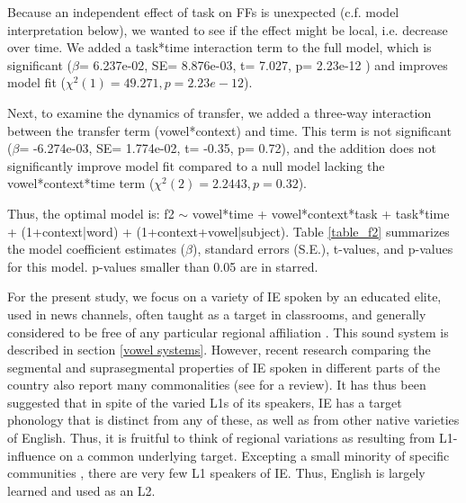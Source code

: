 Because an independent effect of task on FFs is unexpected (c.f. model interpretation below), we wanted to see if the effect might be local, i.e. decrease over time. We added a task*time interaction term to the full model, which is significant ($\beta$= 6.237e-02, SE=  8.876e-03, t= 7.027, p= 2.23e-12 ) and improves model fit ($\chi^2(1) = 49.271, p= 2.23e-12$).

Next, to examine the dynamics of transfer, we added a three-way interaction between the transfer term (vowel*context) and time. This term is not significant ($\beta$= -6.274e-03, SE= 1.774e-02, t= -0.35, p= 0.72), and the addition does not significantly improve model fit compared to a null model lacking the vowel*context*time term ($\chi^2(2) = 2.2443, p= 0.32$).

Thus, the optimal model is: f2 $\sim$ vowel*time + vowel*context*task + task*time + (1+context|word) + (1+context+vowel|subject). Table \ref{table_f2} summarizes the model coefficient estimates ($\beta$), standard errors (S.E.), t-values, and p-values for this model. p-values smaller than 0.05 are in starred.


For the present study, we focus on a variety of IE spoken by an educated elite, used in news channels, often taught as a target in classrooms, and generally considered to be free of any particular regional affiliation \citep[c.f.][who reports this variety to be ``a \textit{de-facto} norm", and thus calls it General(ized) Indian English]{masica1972sound}. This sound system is described in section \ref{vowel systems}. However, recent research comparing the segmental and suprasegmental properties of IE spoken in different parts of the country also report many commonalities (see \cite{sirsa2013effects} for a review). It has thus been suggested that in spite of the varied L1s of its speakers, IE has a target phonology that is distinct from any of these, as well as from other native varieties of English. Thus, it is fruitful to think of regional variations as resulting from L1-influence on a common underlying target. Excepting a small minority of specific communities \citep{pandey201517, wells1982accents, coelho1997anglo}, there are very few L1 speakers of IE. Thus, English is largely learned and used as an L2.


